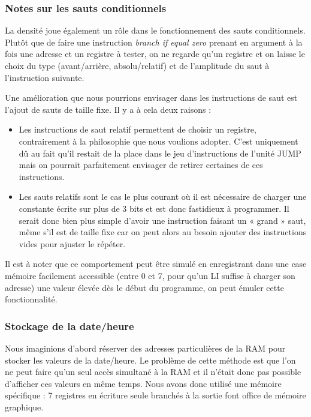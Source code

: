 \documentclass{article}
\begin{document}
\subsubsection{Notes sur les sauts conditionnels}
La densité joue également un rôle dans le fonctionnement des sauts conditionnels.
Plutôt que de faire une instruction \emph{branch if equal zero} prenant en argument
à la fois une adresse et un registre à tester, on ne regarde qu'un registre et on
laisse le choix du type (avant/arrière, absolu/relatif) et de l'amplitude du saut
à l'instruction suivante.

Une amélioration que nous pourrions envisager dans les instructions de saut est
l'ajout de sauts de taille fixe. Il y a à cela deux raisons :
\begin{itemize}
  \item Les instructions de saut relatif permettent de choisir un registre, contrairement
        à la philosophie que nous voulions adopter. C'est uniquement dû au fait qu'il
        restait de la place dans le jeu d'instructions de l'unité JUMP mais on pourrait
        parfaitement envisager de retirer certaines de ces instructions.
  \item Les sauts relatifs sont le cas le plus courant où il est nécessaire de charger
        une constante écrite sur plus de 3 bits et est donc fastidieux à programmer.
        Il serait donc bien plus simple d'avoir une instruction faisant un « grand »
        saut, même s'il est de taille fixe car on peut alors au besoin ajouter des
        instructions vides pour ajuster le répéter.
\end{itemize}

Il est à noter que ce comportement peut être simulé en enregistrant dans une case
mémoire facilement accessible (entre 0 et 7, pour qu'un LI suffise à charger son
adresse) une valeur élevée dès le début du programme, on peut émuler cette fonctionnalité.

\subsubsection{Stockage de la date/heure}
Nous imaginions d'abord réserver des adresses particulières de la RAM pour
stocker les valeurs de la date/heure. Le problème de cette méthode est que l'on
ne peut faire qu'un seul accès simultané à la RAM et il n'était donc pas possible
d'afficher ces valeurs en même temps. Nous avons donc utilisé une mémoire
spécifique : 7 registres en écriture seule branchés à la sortie font office
de mémoire graphique.
\end{document}
